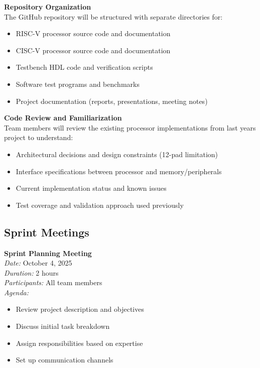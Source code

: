 \documentclass[10pt]{article}
\begin{document}
\noindent\textbf{Repository Organization}\\
The GitHub repository will be structured with separate directories for:
\begin{itemize}
    \item RISC-V processor source code and documentation
    \item CISC-V processor source code and documentation
    \item Testbench HDL code and verification scripts
    \item Software test programs and benchmarks
    \item Project documentation (reports, presentations, meeting notes)
\end{itemize}

\noindent\textbf{Code Review and Familiarization}\\
Team members will review the existing processor implementations from last years project to understand:
\begin{itemize}
    \item Architectural decisions and design constraints (12-pad limitation)
    \item Interface specifications between processor and memory/peripherals
    \item Current implementation status and known issues
    \item Test coverage and validation approach used previously
\end{itemize}

\subsection{Sprint Meetings}

\noindent\textbf{Sprint Planning Meeting}\\
\textit{Date:}  October 4, 2025\\
\textit{Duration:} 2 hours\\
\textit{Participants:} All team members\\
\textit{Agenda:}
\begin{itemize}
    \item Review project description and objectives
    \item Discuss initial task breakdown
    \item Assign responsibilities based on expertise
    \item Set up communication channels
\end{itemize}
\end{document}
